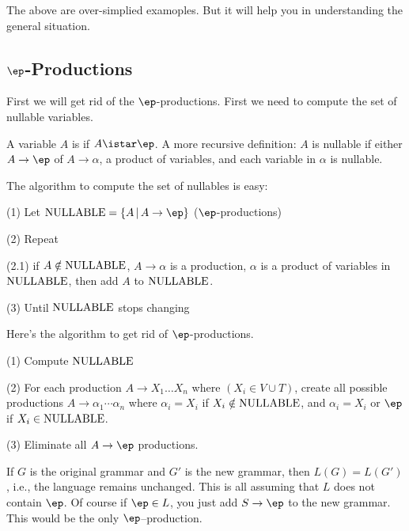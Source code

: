 The above are over-simplied examoples.
But it will help you in understanding the general situation.



\subsection{$\ep$-Productions}

First we will get rid of the $\ep$-productions. First we need to
compute the set of nullable variables.


\begin{defn} A variable $A$ is  if $A \istar
\ep$. A more recursive definition: $A$ is nullable if either $A
\rightarrow \ep$ of $A \rightarrow \alpha$, a product of
variables, and each variable in $\alpha$ is nullable.
\end{defn}

The algorithm to compute the set of nullables is easy:
\begin{mylist}
 \item[(1)] Let $\NULLABLE = \{A \,|\, A\rightarrow \ep\}$
 ($\ep$-productions)
 \item[(2)] Repeat
 \begin{mylist}
  \item[(2.1)] if $A \notin \operatorname{NULLABLE}$, $A \rightarrow
  \alpha$ is a production, $\alpha$ is a product of variables in $\operatorname{NULLABLE}$,
  then add $A$ to $\operatorname{NULLABLE}$.
 \end{mylist}
 \item[(3)] Until $\operatorname{NULLABLE}$ stops changing
\end{mylist}

Here's the algorithm to get rid of $\ep$-productions.
\begin{mylist}
 \item[(1)] Compute $\operatorname{NULLABLE}$
 \item[(2)] For each production $A \rightarrow X_1 \ldots X_n$
 where $(X_i \in V \cup T)$, create all possible productions $A \rightarrow
 \alpha_1 \cdots \alpha_n$ where $\alpha_i = X_i$ if $X_i
 \notin \operatorname{NULLABLE}$, and $\alpha_i = X_i$ or $\ep$ if $X_i \in \operatorname{NULLABLE}$.
 \item[(3)] Eliminate all $A \rightarrow \ep$ productions.
\end{mylist}

If $G$ is the original grammar and $G'$ is the new grammar, then
$L(G) = L(G')$, i.e., the language remains unchanged. This is all
assuming that $L$ does not contain $\ep$. Of course if $\ep \in
L$, you just add $S \rightarrow \ep$ to the new grammar. This
would be the only $\ep$--production.

